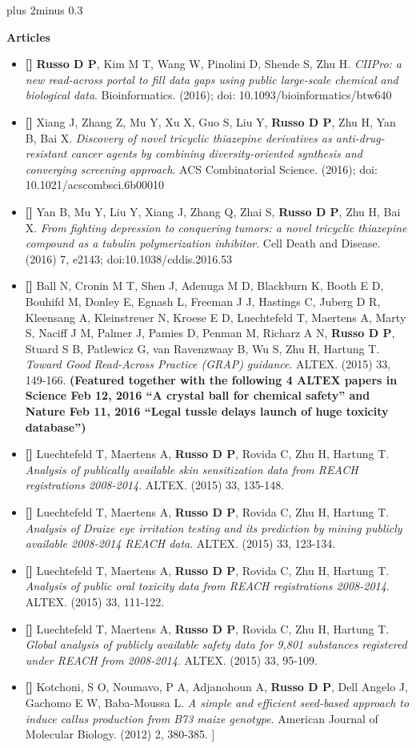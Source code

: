 \documentclass{article} %
\def\bf{\bfseries}
\def\sf{\sffamily}
\newlength\sidebarwidth
\newcommand{\smalltopic}[2]%
	 {\pagebreak[2]%
	 \vskip 1\baselineskip plus 2\baselineskip minus 0.3\baselineskip
	 \begin{minipage}{\textwidth}
         \phantomsection\addcontentsline{toc}{subsection}{#1}%
         \nopagebreak\hspace{0in}%
         \nopagebreak\begin{minipage}[t]{\sidebarwidth - .2cm}
         \raggedleft \bf\sf %
	 \textcolor{dark_blue}{\large #1}%
	 \end{minipage}%
	 \hfill
	 \begin{minipage}[t]{\linewidth - \sidebarwidth}
	 \nopagebreak{%
	    \rule{\linewidth}{.5pt}%
	    \vspace{.1\baselineskip}%
	    }%
	    #2
	 \end{minipage}
	 \end{minipage}}
\begin{document}
\newcommand{\article}{\item[{\bf \textcolor{myblue}{[\stepcounter{ArticleNumber}\arabic{ArticleNumber}]}}]}
\smalltopic{Articles}{
  \begin{itemize}[leftmargin=0ex, itemsep=0ex, labelindent=-4ex, parsep=.5ex]
    \article \textbf{Russo D P}, Kim M T, Wang W, Pinolini D, Shende S, Zhu H. \textit{CIIPro: a new read-across portal to fill data gaps using public large-scale chemical and biological data}. Bioinformatics. (2016); doi: 10.1093/bioinformatics/btw640  
    \article Xiang J, Zhang Z, Mu Y, Xu X, Guo S, Liu Y, \textbf{Russo D P}, Zhu H, Yan B, Bai X. \textit{Discovery of novel tricyclic thiazepine derivatives as anti-drug-resistant cancer agents by combining diversity-oriented synthesis and converging 
	screening approach}. ACS Combinatorial Science. (2016); doi: 10.1021/acscombsci.6b00010
    \article Yan B, Mu Y, Liu Y, Xiang J, Zhang Q, Zhai S, \textbf{Russo D P}, Zhu H, Bai X. \textit{From fighting depression to conquering tumors: a novel tricyclic thiazepine compound as a tubulin polymerization inhibitor}. 
	Cell Death and Disease. (2016) 7, e2143; doi:10.1038/cddis.2016.53  
    \article Ball N, Cronin M T, Shen J, Adenuga M D, Blackburn K, Booth E D, Bouhifd M, Donley E, Egnash L, Freeman J J, Hastings C, Juberg D R, Kleensang A, Kleinstreuer N, Kroese E D, Luechtefeld T, Maertens A, Marty S, Naciff J M, Palmer J, Pamies D,
           Penman M, Richarz A N, \textbf{Russo D P}, Stuard S B, Patlewicz G, van Ravenzwaay B, Wu S, Zhu H, Hartung T. \textit{Toward Good Read-Across Practice (GRAP) guidance}. ALTEX. (2015) 33, 149-166. \textbf{(Featured together with the following 
	4 ALTEX papers in Science Feb 12, 2016 “A crystal ball for chemical safety” and Nature Feb 11, 2016 “Legal tussle delays launch of huge toxicity database”)}
     \article Luechtefeld T, Maertens A, \textbf{Russo D P}, Rovida C, Zhu H, Hartung T. \textit{Analysis of publically available skin sensitization data from REACH registrations 2008-2014}. ALTEX. (2015) 33, 135-148.
     \article Luechtefeld T, Maertens A, \textbf{Russo D P}, Rovida C, Zhu H, Hartung T. \textit{Analysis of Draize eye irritation testing and its prediction by mining publicly available 2008-2014 REACH data}. ALTEX. (2015) 33, 123-134.
     \article Luechtefeld T, Maertens A, \textbf{Russo D P}, Rovida C, Zhu H, Hartung T. \textit{Analysis of public oral toxicity data from REACH registrations 2008-2014}. ALTEX. (2015) 33, 111-122.
     \article Luechtefeld T, Maertens A, \textbf{Russo D P}, Rovida C, Zhu H, Hartung T. \textit{Global analysis of publicly available safety data for 9,801 substances registered under REACH from 2008-2014}. ALTEX. (2015) 33, 95-109.  
     \article Kotchoni, S O, Noumavo, P A, Adjanohoun A, \textbf{Russo D P}, Dell Angelo J, Gachomo E W, Baba-Moussa L. \textit{A simple and efficient seed-based approach to induce callus production from B73 maize genotype}. American Journal of Molecular Biology. (2012) 2, 380-385.   ]	
	
  \end{itemize}
}
\end{document}
